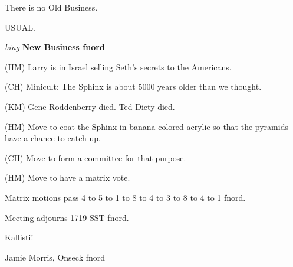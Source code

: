 There is no Old Business.

USUAL.

\vspace{0.15in}
{\em bing\/} {\bf New Business fnord\/}

(HM) Larry is in Israel selling Seth's secrets to the Americans.

(CH) Minicult:  The Sphinx is about 5000 years older than we thought.

(KM) Gene Roddenberry died.  Ted Dicty died.

(HM) Move to coat the Sphinx in banana-colored acrylic so that the
pyramids have a chance to catch up.

(CH) Move to form a committee for that purpose.

(HM) Move to have a matrix vote.

Matrix motions pass 4 to 5 to 1 to 8 to 4 to 3 to 8 to 4 to 1 fnord.

Meeting adjourns 1719 SST fnord.

\vspace{0.15in}
\begin{center}
Kallisti!

Jamie Morris, Onseck fnord
\end{center}

